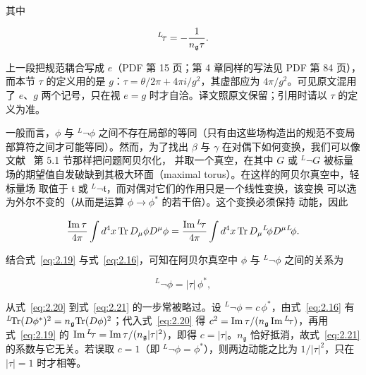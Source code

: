其中

\setcounter{equation}{18}
\begin{equation}\label{eq:2.19}
  ^L\neg \tau = -{1\over n_{\mathfrak g}\tau}.
\end{equation}

\begin{yizhu}[原文疑误]
上一段把规范耦合写成 $e$（PDF 第 15 页；第 4 章同样的写法见 PDF 第 84 页），而本节 $\tau$ 的定义用的是 $g$：$\tau=\theta/2\pi+4\pi i/g^2$，其虚部应为 $4\pi/g^2$。可见原文混用了 $e$、$g$ 两个记号，只在视 $e=g$ 时才自洽。译文照原文保留；引用时请以 $\tau$ 的定义为准。
\end{yizhu}

一般而言，$\phi$ 与 $^L\neg \phi$ 之间不存在局部的等同（只有由这些场构造出的规范不变局部算符之间才可能等同）。然而，为了找出
$\beta$ 与 $\gamma$ 在对偶下如何变换，我们可以像文献~\cite{ref8} 第 5.1 节那样把问题阿贝尔化，
并取一个真空，在其中 $G$ 或 $^L\neg G$ 被标量场的期望值自发破缺到其极大环面（maximal torus）。在这样的阿贝尔真空中，轻标量场
取值于 $\mathfrak t$ 或 $^L\neg \mathfrak t$，而对偶对它们的作用只是一个线性变换，该变换
可以选为外尔不变的（从而是运算 $\phi\to \phi^*$ 的若干倍）。这个变换必须保持
动能，因此

\setcounter{equation}{19}
\begin{equation}\label{eq:2.20}
  {{\rm Im}\,\tau\over 4\pi}\int d^4x\,\Tr\,D_\mu\phi D^\mu\phi=
 {{\rm Im}\,{}^L\neg\tau\over 4\pi}\int d^4x\,\Tr\,D_\mu{}^L\neg\phi D^\mu{}^L\neg\phi.
\end{equation}

结合式~\eqref{eq:2.19} 与式~\eqref{eq:2.16}，可知在阿贝尔真空中
$\phi$ 与 $^L\neg \phi$ 之间的关系为

\setcounter{equation}{20}
\begin{equation}\label{eq:2.21}
  ^L\neg \phi= |\tau|\,\phi^*,
\end{equation}

\begin{yizhu}[含糊点拨]
从式~\eqref{eq:2.20} 到式~\eqref{eq:2.21} 的一步常被略过。设 ${}^L\neg\phi=c\,\phi^*$，由式~\eqref{eq:2.16} 有 ${}^L\neg\Tr(D\phi^*)^2=n_{\mathfrak g}\Tr(D\phi)^2$；代入式~\eqref{eq:2.20} 得 $c^2={\rm Im}\,\tau/(n_{\mathfrak g}\,{\rm Im}\,{}^L\neg\tau)$，再用式~\eqref{eq:2.19} 的 ${\rm Im}\,{}^L\neg\tau={\rm Im}\,\tau/(n_{\mathfrak g}|\tau|^2)$，即得 $c=|\tau|$。$n_{\mathfrak g}$ 恰好抵消，故式~\eqref{eq:2.21} 的系数与它无关。若误取 $c=1$（即 ${}^L\neg\phi=\phi^*$），则两边动能之比为 $1/|\tau|^2$，只在 $|\tau|=1$ 时才相等。
\end{yizhu}

